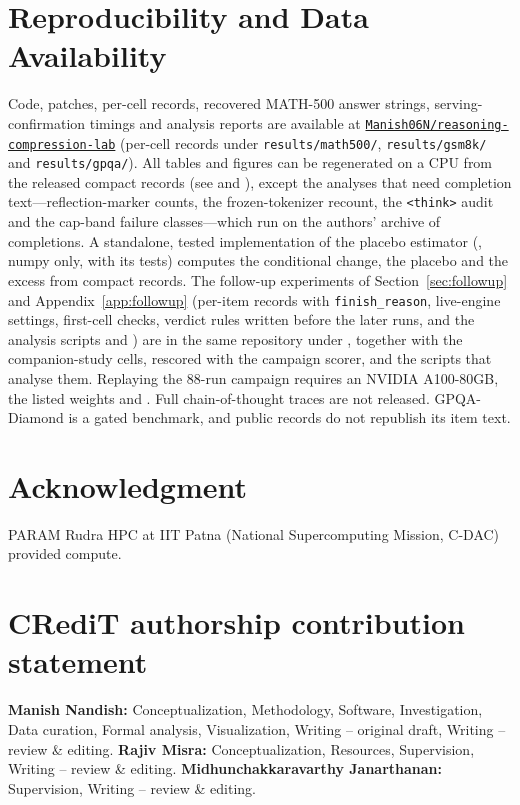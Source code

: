 \documentclass[11pt,a4paper]{article}
\begin{document}
\section*{Reproducibility and Data Availability}
Code, patches, per-cell records, recovered MATH-500 answer strings, serving-confirmation timings and analysis reports are available at \href{https://github.com/Manish06N/reasoning-compression-lab}{\nolinkurl{Manish06N/reasoning-compression-lab}} (per-cell records under \texttt{results/math500/}, \texttt{results/gsm8k/} and \texttt{results/gpqa/}). All tables and figures can be regenerated on a CPU from the released compact records (see  and ), except the analyses that need completion text---reflection-marker counts, the frozen-tokenizer recount, the \texttt{<think>} audit and the cap-band failure classes---which run on the authors' archive of completions. A standalone, tested implementation of the placebo estimator (, numpy only, with its tests) computes the conditional change, the placebo and the excess from compact records. The follow-up experiments of Section~\ref{sec:followup} and Appendix~\ref{app:followup} (per-item records with \texttt{finish\_reason}, live-engine settings, first-cell checks, verdict rules written before the later runs, and the analysis scripts  and ) are in the same repository under , together with the companion-study cells, rescored with the campaign scorer, and the scripts that analyse them. Replaying the 88-run campaign requires an NVIDIA A100-80GB, the listed weights and . Full chain-of-thought traces are not released. GPQA-Diamond is a gated benchmark, and public records do not republish its item text.


\section*{Acknowledgment}
PARAM Rudra HPC at IIT Patna (National Supercomputing Mission, C-DAC) provided compute.

\section*{CRediT authorship contribution statement}
\textbf{Manish Nandish:} Conceptualization, Methodology, Software, Investigation, Data curation, Formal analysis, Visualization, Writing -- original draft, Writing -- review \& editing.
\textbf{Rajiv Misra:} Conceptualization, Resources, Supervision, Writing -- review \& editing.
\textbf{Midhunchakkaravarthy Janarthanan:} Supervision, Writing -- review \& editing.
\end{document}
